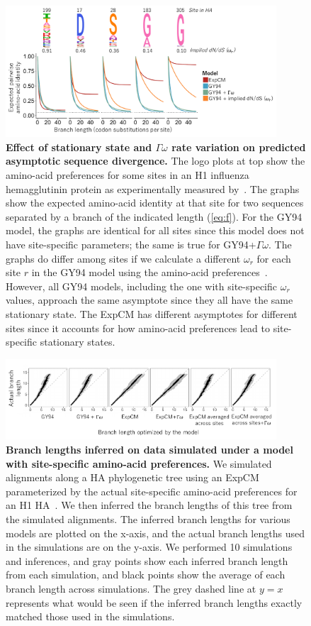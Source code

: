 \documentclass[11pt]{article}
\begin{document}
\begin{figure}[h!]
\centerline{\includegraphics[width=0.90\textwidth]{fig2.pdf}}
\caption{\label{fig:decay}
\textbf{Effect of stationary state and $\Gamma\omega$ rate variation on predicted asymptotic sequence divergence.}
The logo plots at top show the amino-acid preferences for some sites in an H1 influenza hemagglutinin protein as experimentally measured by~\citet{doud2016accurate}.
The graphs show the expected amino-acid identity at that site for two sequences separated by a branch of the indicated length (\ref{eq:f}).
For the GY94 model, the graphs are identical for all sites since this model does not have site-specific parameters; the same is true for GY94+$\Gamma\omega$.
The graphs do differ among sites if we calculate a different $\omega_r$ for each site $r$ in the GY94 model using the amino-acid preferences~\citep[\ref{eq:w_r};][]{spielman2015relationship}.
However, all GY94 models, including the one with site-specific $\omega_r$ values, approach the same asymptote since they all have the same stationary state.
The ExpCM has different asymptotes for different sites since it accounts for how amino-acid preferences lead to site-specific stationary states.
}
\end{figure}
\newpage
\begin{figure}[h!]
\centerline{\includegraphics[width=0.9\textwidth]{fig3.pdf}}
\caption{\label{fig:simulations}
\textbf{Branch lengths inferred on data simulated under a model with site-specific amino-acid preferences.} 
We simulated alignments along a HA phylogenetic tree using an ExpCM parameterized by the actual site-specific amino-acid preferences for an H1 HA~\citep{doud2016accurate}.
We then inferred the branch lengths of this tree from the simulated alignments.
The inferred branch lengths for various models are plotted on the x-axis, and the actual branch lengths used in the simulations are on the y-axis.
We performed 10 simulations and inferences, and gray points show each inferred branch length from each simulation, and black points show the average of each branch length across simulations.
The grey dashed line at $y=x$ represents what would be seen if the inferred branch lengths exactly matched those used in the simulations. 
}
\end{figure}
\end{document}
